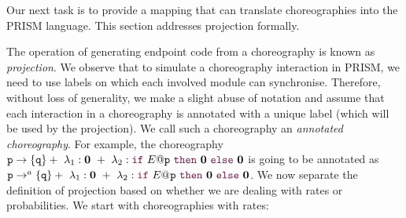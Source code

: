 Our next task is to provide a mapping that can translate
choreographies into the PRISM language. This section addresses
projection formally.

  The operation of generating
endpoint code from a choreography is known as {\em
  projection}. 
We observe that to simulate a choreography interaction in
PRISM, we need to use labels on which each involved module can
synchronise. Therefore, without loss of generality, we make a slight
abuse of notation and assume that each interaction in a choreography
is annotated with a unique label (which will be used by the
projection). We call such a choreography an {\em annotated
  choreography}. 
%
% 
For example, the choreography
$\interactBase{p}{q} +\ \lambda_1: \CEnd \ +\ \lambda_2: \ifTE
  {E}{p}{\CEnd}{\CEnd}$ is going to be annotated as
  $\interactBasel{p}{a}{q} +\ \lambda_1: \CEnd \ +\ \lambda_2: \ifTEl
    {E}{}{p}{\CEnd}{\CEnd}$.
We now separate the definition of projection based on whether we
are dealing with rates or probabilities.  We start with choreographies 
with rates: 
% 
